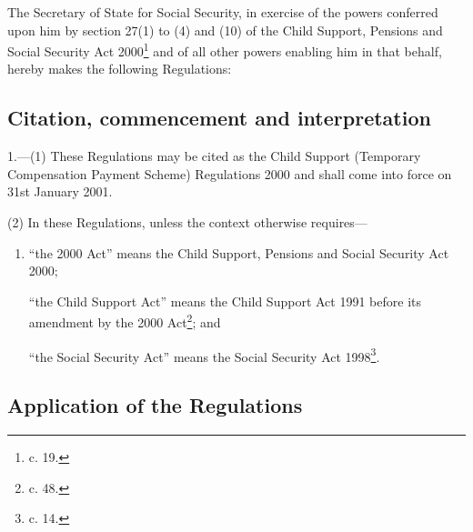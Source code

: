\documentclass[12pt,a4paper]{article}
\title{\regstitle}
\author{S.I. 2000 No. 3174}
\date{Made 30th November 2000\\Laid before Parliament 6th December 2000\\Coming into force 31st January 2001}
\begin{document}
\maketitle

\noindent
The Secretary of State for Social Security, in exercise of the powers conferred upon him by section 27(1) to (4) and (10) of the Child Support, Pensions and Social Security Act 2000\footnote{ c. 19.} and of all other powers enabling him in that behalf, hereby makes the following Regulations: 

{\sloppy

\tableofcontents

}

\bigskip

\setcounter{secnumdepth}{-2}

\subsection[1. Citation, commencement and interpretation]{Citation, commencement and interpretation}

1.---(1)  These Regulations may be cited as the Child Support (Temporary Compensation Payment Scheme) Regulations 2000 and shall come into force on 31st January 2001.

\pagebreak[3]

(2) In these Regulations, unless the context otherwise requires—
\begin{enumerate}\item[]
“the 2000 Act” means the Child Support, Pensions and Social Security Act 2000;

“the Child Support Act” means the Child Support Act 1991 before its amendment by the 2000 Act\footnote{ c. 48.}; and

“the Social Security Act” means the Social Security Act 1998\footnote{ c. 14.}.
\end{enumerate}

\subsection[2. Application of the Regulations]{Application of the Regulations}
\end{document}
